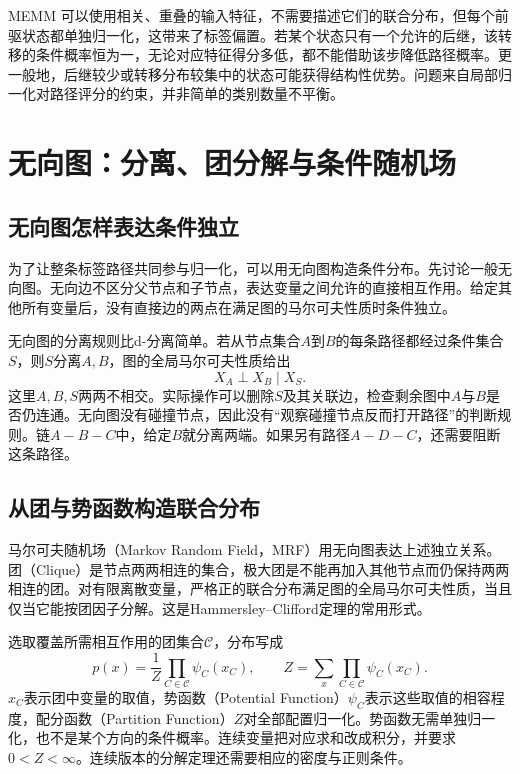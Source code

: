 MEMM 可以使用相关、重叠的输入特征，不需要描述它们的联合分布，但每个前驱状态都单独归一化，这带来了标签偏置。若某个状态只有一个允许的后继，该转移的条件概率恒为一，无论对应特征得分多低，都不能借助该步降低路径概率。更一般地，后继较少或转移分布较集中的状态可能获得结构性优势。问题来自局部归一化对路径评分的约束，并非简单的类别数量不平衡。

\section{无向图：分离、团分解与条件随机场}
\subsection{无向图怎样表达条件独立}
为了让整条标签路径共同参与归一化，可以用无向图构造条件分布。先讨论一般无向图。无向边不区分父节点和子节点，表达变量之间允许的直接相互作用。给定其他所有变量后，没有直接边的两点在满足图的马尔可夫性质时条件独立。

无向图的分离规则比d-分离简单。若从节点集合$A$到$B$的每条路径都经过条件集合$S$，则$S$分离$A,B$，图的全局马尔可夫性质给出
\begin{equation}
 X_A\perp X_B\mid X_S.
 \label{eq:bayes-undirected-separation}
\end{equation}
这里$A,B,S$两两不相交。实际操作可以删除$S$及其关联边，检查剩余图中$A$与$B$是否仍连通。无向图没有碰撞节点，因此没有“观察碰撞节点反而打开路径”的判断规则。链$A-B-C$中，给定$B$就分离两端。如果另有路径$A-D-C$，还需要阻断这条路径。

\subsection{从团与势函数构造联合分布}
马尔可夫随机场（Markov Random Field，MRF）用无向图表达上述独立关系。团（Clique）是节点两两相连的集合，极大团是不能再加入其他节点而仍保持两两相连的团。对有限离散变量，严格正的联合分布满足图的全局马尔可夫性质，当且仅当它能按团因子分解。这是Hammersley--Clifford定理的常用形式。

选取覆盖所需相互作用的团集合$\mathcal C$，分布写成
\begin{equation}
 p(x)=\frac{1}{Z}\prod_{C\in\mathcal C}\psi_C(x_C),\qquad
 Z=\sum_x\prod_{C\in\mathcal C}\psi_C(x_C).
 \label{eq:bayes-undirected-factorization}
\end{equation}
$x_C$表示团中变量的取值，势函数（Potential Function）$\psi_C$表示这些取值的相容程度，配分函数（Partition Function）$Z$对全部配置归一化。势函数无需单独归一化，也不是某个方向的条件概率。连续变量把对应求和改成积分，并要求$0<Z<\infty$。连续版本的分解定理还需要相应的密度与正则条件。

